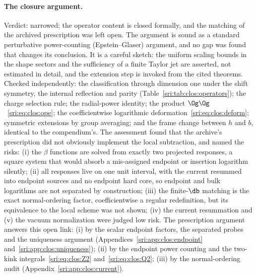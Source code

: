 \paragraph{The closure argument.} Verdict: narrowed; the operator content is closed formally, and the matching of the
archived prescription was left open. The argument is sound as a standard
perturbative power-counting (Epstein--Glaser) argument, and no gap was found that changes its conclusion. It is a
careful sketch: the uniform scaling bounds in the shape sectors and the sufficiency of a finite Taylor jet are
asserted, not estimated in detail, and the extension step is invoked from the cited theorems. Checked independently:
the classification through dimension one under the shift symmetry, the internal reflection and parity
(Table~\ref{sri:tab:clos:operators}); the charge selection rule; the radial-power identity; the product
$\Og\Og$~\eqref{sri:eq:clos:ope}; the coefficientwise logarithmic deformation~\eqref{sri:eq:clos:deform}; symmetric extensions by
group averaging; and the frame change between $h$ and $b$, identical to the compendium's. The assessment found that
the archive's prescription did not obviously implement the local subtraction, and named the risks: (i) the $\beta$
functions are solved from exactly two projected responses, a square system that would absorb a mis-assigned endpoint
or insertion logarithm silently; (ii) all responses live on one unit interval, with the current resummed into endpoint
sources and no endpoint hard core, so endpoint and bulk logarithms are not separated by construction; (iii) the
finite-$\db$ matching is the exact normal-ordering factor, coefficientwise a regular redefinition, but its equivalence
to the local scheme was not shown; (iv) the current resummation and (v) the vacuum normalization were judged low risk.
The prescription argument answers this open link: (i) by the scalar endpoint factors, the separated probes and the
uniqueness argument (Appendices~\ref{sri:app:clos:endpoint} and~\ref{sri:app:clos:uniqueness}); (ii) by the endpoint power
counting and the two-kink integrals~\eqref{sri:eq:clos:Z2} and~\eqref{sri:eq:clos:Q2}; (iii) by the normal-ordering audit
(Appendix~\ref{sri:app:clos:current}).

